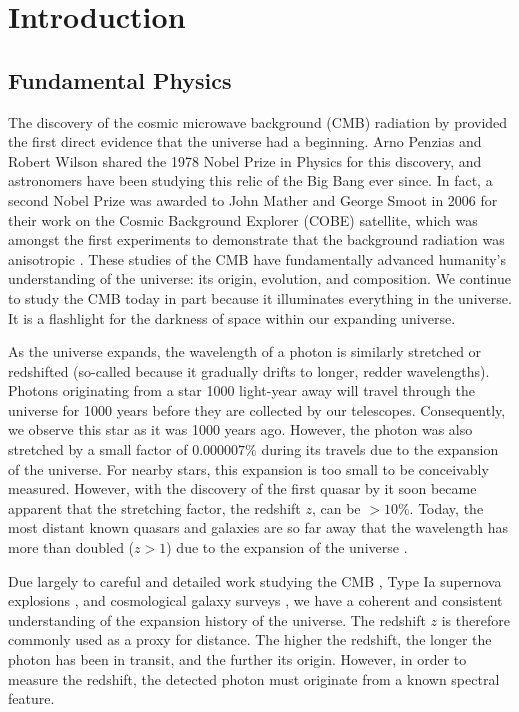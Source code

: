 \chapter{Introduction}

\begin{bibunit}

\section{Fundamental Physics}

The discovery of the cosmic microwave background (CMB) radiation by \citet{1965ApJ...142..419P}
provided the first direct evidence that the universe had a beginning. Arno Penzias and Robert Wilson
shared the 1978 Nobel Prize in Physics for this discovery, and astronomers have been studying this
relic of the Big Bang ever since. In fact, a second Nobel Prize was awarded to John Mather and
George Smoot in 2006 for their work on the Cosmic Background Explorer (COBE) satellite, which was
amongst the first experiments to demonstrate that the background radiation was anisotropic
\citep{1992ApJ...396L...1S}. These studies of the CMB have fundamentally advanced humanity's
understanding of the universe: its origin, evolution, and composition. We continue to study the CMB
today in part because it illuminates everything in the universe. It is a flashlight for the darkness
of space within our expanding universe.

As the universe expands, the wavelength of a photon is similarly stretched or redshifted (so-called
because it gradually drifts to longer, redder wavelengths). Photons originating from a star 1000
light-year away will travel through the universe for 1000 years before they are collected by our
telescopes. Consequently, we observe this star as it was 1000 years ago. However, the photon was
also stretched by a small factor of $0.000007\%$ during its travels due to the expansion of the
universe.  For nearby stars, this expansion is too small to be conceivably measured.  However, with
the discovery of the first quasar by \citet{1963Natur.197.1040S} it soon became apparent that the
stretching factor, the redshift $z$, can be $>10\%$. Today, the most distant known quasars and
galaxies are so far away that the wavelength has more than doubled ($z > 1$) due to the expansion of
the universe \citep[e.g.,][]{2011Natur.474..616M, 2015ApJ...810L..12Z, 2016ApJ...819..129O,
2018Natur.553..473B}.

Due largely to careful and detailed work studying the CMB \citep[e.g.,][]{2013ApJS..208...19H,
2016A&A...594A..25P}, Type Ia supernova explosions \citep[e.g.,][]{1998AJ....116.1009R,
1999ApJ...517..565P}, and cosmological galaxy surveys \citep[e.g.,][]{2001MNRAS.328.1039C}, we have
a coherent and consistent understanding of the expansion history of the universe. The redshift $z$
is therefore commonly used as a proxy for distance. The higher the redshift, the longer the photon
has been in transit, and the further its origin. However, in order to measure the redshift, the
detected photon must originate from a known spectral feature.


\end{bibunit}
